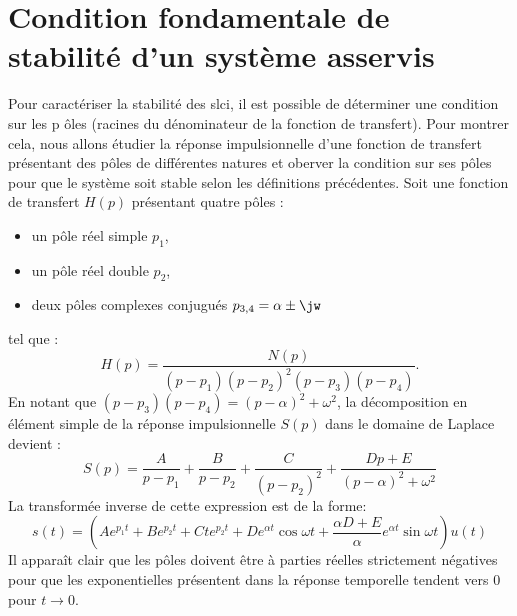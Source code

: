 \section[Condition fondamentale de stabilité]
{Condition fondamentale de stabilité d'un système asservis}
Pour caractériser la stabilité des \gls{slci}, il est possible de déterminer
une condition sur les p ôles (racines du dénominateur de la fonction de 
transfert). Pour montrer cela, nous allons étudier la réponse impulsionnelle 
d'une fonction de transfert présentant des pôles de différentes natures et 
oberver la condition sur ses pôles pour que le système soit stable selon les 
définitions précédentes. 
Soit une fonction de transfert $H(p)$ présentant quatre pôles :
\begin{itemize}
    \item un pôle réel simple $p_1$,
    \item un pôle réel double $p_2$,
    \item deux pôles complexes conjugués $p_{3,4}=\alpha\pm\jw$
\end{itemize}
tel que :
\[
    H(p)=\dfrac{N(p)}{(p-p_1)(p-p_2)^2(p-p_3)(p-p_4)}.
\]
En notant que $(p-p_3)(p-p_4)=(p-\alpha)^2+\omega^2$, 
la décomposition en élément simple de la réponse impulsionnelle $S(p)$ 
dans le domaine de Laplace devient :
\[
    S(p)=\dfrac{A}{p-p_1}
        +\dfrac{B}{p-p_2}
        +\dfrac{C}{(p-p_2)^2}
        +\dfrac{Dp+E}{(p-\alpha)^2+\omega^2}
\]
La transformée inverse de cette expression est de la forme:
\[
    s(t)=\left(Ae^{p_1t}
              +Be^{p_2t}
              +Cte^{p_2t}
              +De^{\alpha t}\cos{\omega t}
              +\dfrac{\alpha D+E}{\alpha}e^{\alpha t}\sin{\omega t}\right)u(t)
\]
Il apparaît clair que les pôles doivent être à parties réelles strictement 
négatives pour que les exponentielles présentent dans la réponse temporelle
tendent vers 0 pour $t\to0$.
\clearpage
\thispagestyle{empty}
